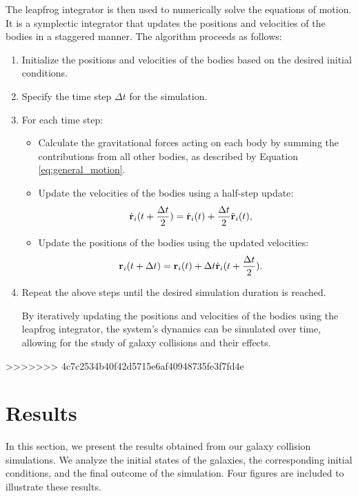 \documentclass[reprint, amsmath, amssymb, aps]{revtex4-2}
\begin{document}
The leapfrog integrator is then used to numerically solve the equations of motion. It is a symplectic integrator that updates the positions and velocities of the bodies in a staggered manner. The algorithm proceeds as follows:
\begin{enumerate}
    \item Initialize the positions and velocities of the bodies based on the desired initial conditions.
    \item Specify the time step $\Delta t$ for the simulation.
    \item For each time step: \begin{itemize}
            \item Calculate the gravitational forces acting on each body by summing the contributions from all other bodies, as described by Equation \ref{eq:general_motion}.
            \item Update the velocities of the bodies using a half-step update:
            \begin{align*}
                \dot{{\bf r}}_i(t + \frac{\Delta t}{2}) &= \dot{{\bf r}}_i(t) + \frac{\Delta t}{2} \ddot{{\bf r}}_i(t),
            \end{align*}
            \item Update the positions of the bodies using the updated velocities:
            \begin{align*}
                {\bf r}_i(t + \Delta t) &= {\bf r}_i(t) + \Delta t \dot{{\bf r}}_i(t + \frac{\Delta t}{2}).
            \end{align*}
        \end{itemize}
    \item Repeat the above steps until the desired simulation duration is reached.

    By iteratively updating the positions and velocities of the bodies using the leapfrog integrator, the system's dynamics can be simulated over time, allowing for the study of galaxy collisions and their effects.
\end{enumerate}

>>>>>>> 4c7c2534b40f42d5715e6af40948735fe3f7fd4e

\section{Results}

In this section, we present the results obtained from our galaxy collision simulations. We analyze the initial states of the galaxies, the corresponding initial conditions, and the final outcome of the simulation. Four figures are included to illustrate these results.
\end{document}
